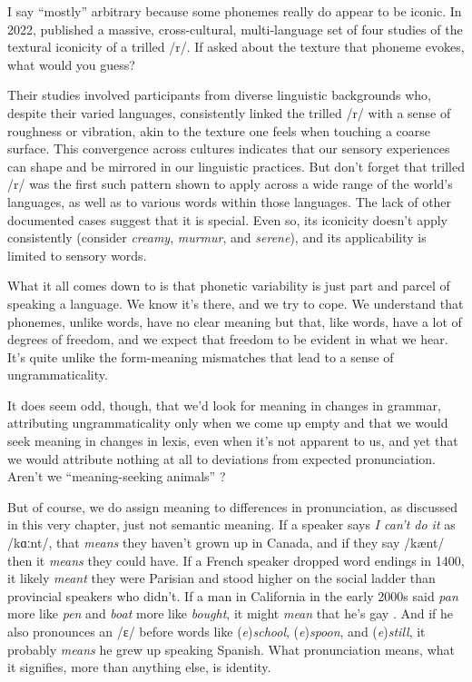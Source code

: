 I say ``mostly'' arbitrary because some phonemes really do appear to be iconic. In 2022, \citet{Winter2022} published a massive, cross-cultural, multi-language set of four studies of the textural iconicity of a trilled /r/. If asked about the texture that phoneme evokes, what would you guess?

Their studies involved participants from diverse linguistic backgrounds who, despite their varied languages, consistently linked the trilled /r/ with a sense of roughness or vibration, akin to the texture one feels when touching a coarse surface.  This convergence across cultures indicates that our sensory experiences can shape and be mirrored in our linguistic practices. But don't forget that trilled /r/ was the first such pattern shown to apply across a wide range of the world's languages, as well as to various words within those languages. The lack of other documented cases suggest that it is special. Even so, its iconicity doesn't apply consistently (consider \textit{creamy}, \textit{murmur}, and \textit{serene}), and its applicability is limited to sensory words.


What it all comes down to is that phonetic variability is just part and parcel of speaking a language. We know it's there, and we try to cope. We understand that phonemes, unlike words, have no clear meaning but that, like words, have a lot of degrees of freedom, and we expect that freedom to be evident in what we hear. It's quite unlike the form-meaning mismatches that lead to a sense of ungrammaticality.

\bigskip

It does seem odd, though, that we'd look for meaning in changes in grammar, attributing ungrammaticality only when we come up empty and that we would seek meaning in changes in lexis, even when it's not apparent to us, and yet that we would attribute nothing at all to deviations from expected pronunciation. Aren't we ``meaning-seeking animals'' \citep[636]{Geertz2016}?

But of course, we do assign meaning to differences in pronunciation, as discussed in this very chapter, just not semantic meaning. If a speaker says \textit{I can't do it} as /kɑːnt/, that \textit{means} they haven't grown up in Canada, and if they say /kænt/ then it \textit{means} they could have. If a French speaker dropped word endings in 1400, it likely \textit{meant} they were Parisian and stood higher on the social ladder than provincial speakers who didn't. If a man in California in the early 2000s said \textit{pan} more like \textit{pen} and \textit{boat} more like \textit{bought}, it might \textit{mean} that he's gay \citep{Podesva2011}. And if he also pronounces an /ɛ/ before words like (\textit{e})\textit{school}, (\textit{e})\textit{spoon}, and (\textit{e})\textit{still}, it probably \textit{means} he grew up speaking Spanish. What pronunciation means, what it signifies, more than anything else, is identity.

